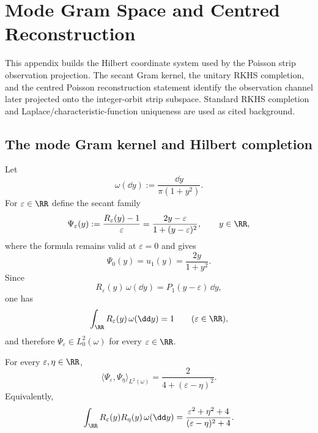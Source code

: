 
\section{Mode Gram Space and Centred Reconstruction}%
\label{sec:gram-space}

This appendix builds the Hilbert coordinate system used by the Poisson strip
observation projection.  The secant Gram kernel, the unitary RKHS completion,
and the centred Poisson reconstruction statement identify the observation
channel later projected onto the integer-orbit strip subspace.  Standard RKHS
completion and Laplace/characteristic-function uniqueness are used as cited
background.

\subsection{The mode Gram kernel and Hilbert completion}

Let
\[
\omega(\dd y):=\frac{\dd y}{\pi(1+y^2)}.
\]
For $\varepsilon\in\RR$ define the secant family
\begin{equation}\label{eq:mode-secant-family}
\Psi_\varepsilon(y):=\frac{R_\varepsilon(y)-1}{\varepsilon}
=\frac{2y-\varepsilon}{1+(y-\varepsilon)^2},
\qquad y\in\RR,
\end{equation}
where the formula remains valid at $\varepsilon=0$ and gives
\[
\Psi_0(y)=u_1(y)=\frac{2y}{1+y^2}.
\]
Since
\[
R_\varepsilon(y)\,\omega(\dd y)=P_1(y-\varepsilon)\,\dd y,
\]
one has
\[
\int_{\RR}R_\varepsilon(y)\,\omega(\dd y)=1
\qquad(\varepsilon\in\RR),
\]
and therefore $\Psi_\varepsilon\in L^2_0(\omega)$ for every
$\varepsilon\in\RR$.

\begin{theorem}%
\label{thm:mode-gram-kernel}
For every $\varepsilon,\eta\in\RR$,
\begin{equation}\label{eq:mode-gram-kernel}
\langle \Psi_\varepsilon,\Psi_\eta\rangle_{L^2(\omega)}
=\frac{2}{4+(\varepsilon-\eta)^2}.
\end{equation}
Equivalently,
\begin{equation}\label{eq:mode-gram-RR}
\int_{\RR}R_\varepsilon(y)R_\eta(y)\,\omega(\dd y)
=\frac{\varepsilon^2+\eta^2+4}{(\varepsilon-\eta)^2+4}.
\end{equation}
\end{theorem}

